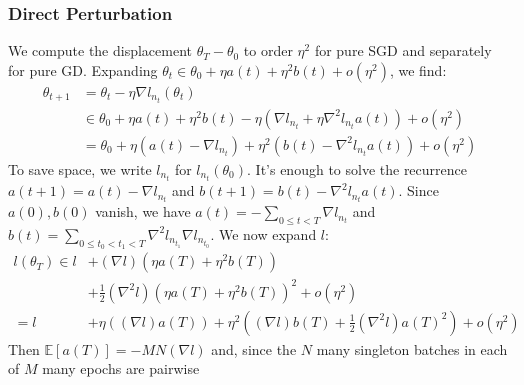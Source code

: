 \documentclass{article}
\theoremstyle{plain}
\theoremstyle{definition}
\newcommand{\expct}[1]{\mathbb{E}\left[#1\right]}
\begin{document}
        \subsubsection*{Direct Perturbation} 
            We compute the displacement $\theta_T-\theta_0$ to order $\eta^2$ 
            for pure SGD and separately for pure GD.  Expanding
            $
                \theta_t \in \theta_0 + \eta a(t) + \eta^2 b(t) + o(\eta^2)
            $, we find:
            \begin{align*}
                \theta_{t+1} &=     \theta_t - \eta \nabla l_{n_t} (\theta_t) \\
                             &\in       \theta_0
                                    +   \eta a(t) + \eta^2 b(t)
                                    -   \eta (
                                                \nabla l_{n_t}
                                            +   \eta \nabla^2 l_{n_t} a(t) 
                                        )
                                    +   o(\eta^2) \\
                             &=     \theta_0
                                +   \eta (a(t) - \nabla l_{n_t})
                                +   \eta^2 (b(t) - \nabla^2 l_{n_t} a(t)) 
                                +   o(\eta^2)
            \end{align*}
            To save space, we write $l_{n_t}$ for $l_{n_t}(\theta_0)$.  It's
            enough to solve the recurrence $a(t+1) = a(t) - \nabla l_{n_t}$ and
            $b(t+1) = b(t) - \nabla^2 l_{n_t} a(t)$.  Since $a(0), b(0)$
            vanish, we have $a(t) =-\sum_{0\leq t<T} \nabla l_{n_t}$ and $b(t)
            = \sum_{0\leq t_0 < t_1 < T} \nabla^2 l_{n_{t_1}} \nabla
            l_{n_{t_0}}$.  We now expand $l$:
            \begin{align*}
                l(\theta_T) \in    l   &+   (\nabla l) (\eta a(T) + \eta^2 b(T)) \\
                                       &+   \frac{1}{2} (\nabla^2 l) (\eta a(T) + \eta^2 b(T))^2
                                        +   o(\eta^2) \\
                            =      l   &+   \eta ((\nabla l) a(T))
                                        +   \eta^2 ((\nabla l) b(T) + \frac{1}{2} (\nabla^2 l) a(T)^2 )
                                        +   o(\eta^2)
            \end{align*}
            Then $\expct{a(T)} = -MN(\nabla l)$ and, since the $N$ many
            singleton batches in each of $M$ many epochs are pairwise
\end{document}
